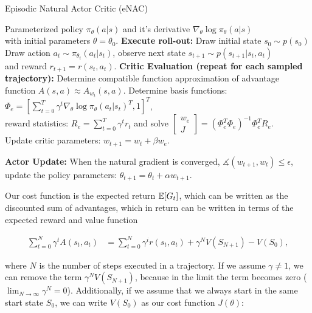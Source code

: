 \begin{algorithm}
	\caption{Episodic Natural Actor Critic (eNAC)}\label{enac-algo}
	\begin{algorithmic}[1]
		\REQUIRE Parameterized policy $\pi_{\theta}(a|s)$ and it's derivative $\nabla_\theta\log\pi_{\theta}(a|s)$\\
		\hspace{1.05cm}  with initial parameters $\theta=\theta_0$.
		\STATE \textbf{Execute roll-out:} Draw initial state $s_0 \sim p(s_0)$
		\STATE Draw action $a_t\sim\pi_{\theta_t}(a_t|s_t)$, observe next state $s_{t+1} \sim p(s_{t+1}|s_t, a_t)$\\
		and reward $r_{t+1} = r(s_t, a_t)$.
		\ENDFOR
		\ENDFOR
		\STATE \textbf{Critic Evaluation (repeat for each sampled trajectory):} Determine compatible function approximation of advantage function $A(s,a) \approx A_{w_t}(s, a)$.
		\STATE Determine basis functions: $\Phi_e = \left[\sum_{t=0}^T\gamma^t\nabla_\theta\log\pi_{\theta}(a_t|s_t)^T, 1\right]^T$, \\
		reward statistics: $R_e=\sum_{t=0}^T\gamma^t r_t$ and solve $\begin{bmatrix} w_{e}\\J \end{bmatrix} = (\Phi_e^T \Phi_e)^{-1} \Phi_e^T R_e$.\\
		Update critic parameters: $w_{t+1} = w_t + \beta w_{e}$.
		
		\STATE \textbf{Actor Update:} When the natural gradient is converged, $\measuredangle (w_{t+1}, w_t)\leq\epsilon$, update the policy parameters: $\theta_{t+1} = \theta_t + \alpha w_{t+1}$.
		\ENDFOR
	\end{algorithmic}
\end{algorithm}

Our cost function is the expected return $\operatorname{\mathbb{E}}[G_t]$, which can be written as the discounted sum of advantages, which in return can be written in terms of the expected reward and value function \citep{peters2005natural}

\begin{align}
\sum_{t = 0}^{N}\gamma^t A(s_t, a_t) &= \sum_{t = 0}^{N}\gamma^i r(s_t, a_t) + \gamma^N V(S_{N+1}) - V(S_0),
\end{align}

where $N$ is the number of steps executed in a trajectory. If we assume $\gamma \neq 1$, we can remove the term $\gamma^N V(S_{N+1})$, because in the limit the term becomes zero ($\lim_{N \rightarrow \infty}\gamma^N = 0$). Additionally, if we assume that we always start in the same start state $S_0$, we can write $V(S_0)$ as our cost function $J(\theta)$:

